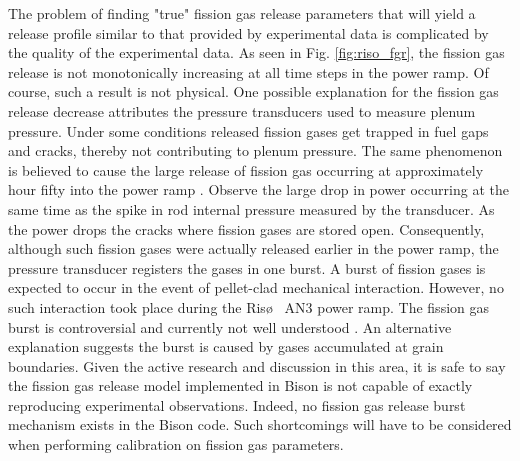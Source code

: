The problem of finding "true" fission gas release parameters that will yield a release profile similar to that provided by experimental data is complicated by the quality of the experimental data. As seen in Fig. \ref{fig:riso_fgr}, the fission gas release is not monotonically increasing at all time steps in the power ramp. Of course, such a result is not physical. One possible explanation for the fission gas release decrease attributes the pressure transducers used to measure plenum pressure. Under some conditions released fission gases get trapped in fuel gaps and cracks, thereby not contributing to plenum pressure. The same phenomenon is believed to cause the large release of fission gas occurring at approximately hour fifty into the power ramp \cite{Pastore1}. Observe the large drop in power occurring at the same time as the spike in rod internal pressure measured by the transducer. As the power drops the cracks where fission gases are stored open. Consequently, although such fission gases were actually released earlier in the power ramp, the pressure transducer registers the gases in one burst. A burst of fission gases is expected to occur in the event of pellet-clad mechanical interaction. However, no such interaction took place during the Ris\o~ AN3 power ramp. The fission gas burst is controversial and currently not well understood \cite{Pastore1}. An alternative explanation suggests the burst is caused by gases accumulated at grain boundaries. Given the active research and discussion in this area, it is safe to say the fission gas release model implemented in Bison is not capable of exactly reproducing experimental observations. Indeed, no fission gas release burst mechanism exists in the Bison code. Such shortcomings will have to be considered when performing calibration on fission gas parameters.    



